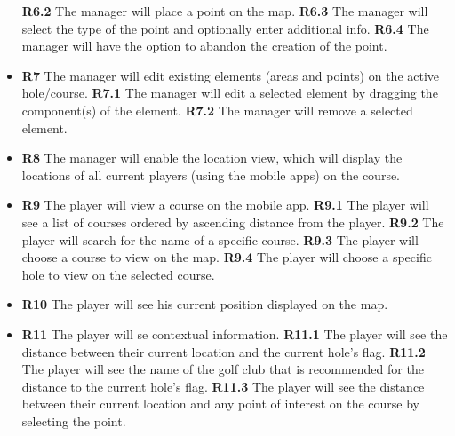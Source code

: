 \documentclass{article}
\begin{document}
\begin{itemize}
            \subitem \textbf{R6.2} The manager will place a point on the map.
            \subitem \textbf{R6.3} The manager will select the type of the
            point and optionally enter additional info.
            \subitem \textbf{R6.4} The manager will have the option to abandon
            the creation of the point.
        \item
            \textbf{R7} The manager will edit existing elements (areas and
            points) on the active hole/course.
            \subitem \textbf{R7.1} The manager will edit a selected element by
            dragging the component(s) of the element.
            \subitem \textbf{R7.2} The manager will remove a selected element.
        \item
            \textbf{R8} The manager will enable the location view, which will
            display the locations of all current players (using the mobile
            apps) on the course.
        \item
            \textbf{R9} The player will view a course on the mobile app.
            \subitem \textbf{R9.1} The player will see a list of courses
            ordered by ascending distance from the player.
            \subitem \textbf{R9.2} The player will search for the name of a
            specific course.
            \subitem \textbf{R9.3} The player will choose a course to view on
            the map.
            \subitem \textbf{R9.4} The player will choose a specific hole to
            view on the selected course.
        \item
            \textbf{R10} The player will see his current position displayed on
            the map.
        \item
            \textbf{R11} The player will se contextual information.
            \subitem \textbf{R11.1} The player will see the distance between their
            current location and the current hole's flag.
            \subitem \textbf{R11.2} The player will see the name of the golf club
            that is recommended for the distance to the current hole's flag.
            \subitem \textbf{R11.3} The player will see the distance between
            their current location and any point of interest on the course by
            selecting the point.
    \end{itemize}
    
\end{document}
